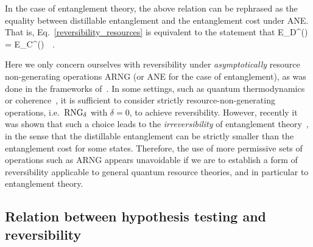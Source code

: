\documentclass[11pt,notitlepage,tightenlines,nofootinbib,superscriptaddress]{revtex4-1}
\newcommand{\marco}[1]{{\color{blue} #1}}
\begin{document}
In the case of entanglement theory, the above relation can be rephrased as the equality between distillable entanglement and the entanglement cost under ANE. That is, Eq.~\eqref{reversibility_resources} is equivalent to the statement that
\bb
E_D^{}(\rho) = E_C^{}(\rho)\qquad \forall\ \rho\, .
\ee

Here we only concern ourselves with reversibility under \emph{asymptotically} resource non-generating operations ARNG (or ANE for the case of entanglement), as was done in the frameworks of~\cite{BrandaoPlenio1,BrandaoPlenio2,Brandao-Gour}. In some settings, such as quantum thermodynamics~\cite{Brandao-thermo,Faist2019} or coherence~\cite{Chitambar-reversible}, it is sufficient to consider strictly resource-non-generating operations, i.e.\ $\mathrm{RNG}_\delta$ with $\delta=0$, to achieve reversibility. However, recently it was shown that such a choice leads to the \emph{irreversibility} of entanglement theory~\cite{irreversibility}, in the sense that the distillable entanglement can be strictly smaller than the entanglement cost for some states. Therefore, the use of more permissive sets of operations such as ARNG appears unavoidable if we are to establish a form of reversibility applicable to general quantum resource theories, and in particular to entanglement theory.


\subsection{Relation between hypothesis testing and reversibility}\label{sec:hyptest_reversibility}
\end{document}
